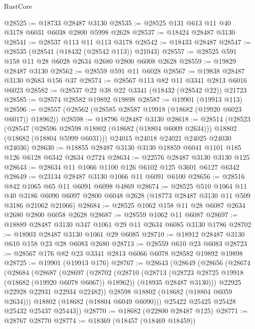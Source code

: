 \begin{lexlean}{RustCore}
\begin{coremodule}
@28525 := @18733 @28487 @3130
@28535 := @28525 @131 @613 @11 @40 @3178 @6031 @6038 @2800 @5998 @2628
@28537 := @18424 @28487 @3130
@28541 := @28537 @113 @11 @113 @3178
@28542 := @18433 @28487
@28547 := @28535 (@28541 (@18432 (@28542 @113)) @21043)
@28557 := @28525 @591 @158 @11 @28 @6028 @2634 @2680 @2800 @6008 @2628
@28559 := @19829 @28487 @3130
@28562 := @28559 @591 @11 @6028
@28567 := @19838 @28487 @3130 @2683 @156 @37
@28574 := @28567 @113 @82 @11 @3341 @2813 @6016 @6023
@28582 := @28537 @22 @38 @22 @3341 (@18432 (@28542 @22)) @21723
@28585 := @28574 @28582 @19892 @19898
@28587 := @19901 (@19913 @113)
@28596 := @28557 (@28562 (@28585 @28587 @19918 (@18682 (@19920 @6023 @6017)) @18962))
@28598 := @18796 @28487 @3130
@28618 := @28514
    (@28523
      (@28547
        (@28596 @28598 @18802 (@18682 (@18804 @6009 @2634)))
        @18802
        (@18682 (@18804 @5999 @6031)))
      @24015
      @24018
      @24021
      @24025
      @24030
      @24036)
@28630 := @18855 @28487 @3130 @3130 @18859 @6041 @1101 @185 @126 @6128 @6342 @2634 @2724
@28634 := @22576 @28487 @3130 @3130 @125
@28643 := @28634 @11 @1066 @1100 @126 @6102 @125 @3601 @6127 @6342
@28649 := @23134 @28487 @3130 @1066 @11 @6091 @6100
@28656 := @28516 @842 @1065 @65 @11 @6091 @6098 @4869
@28674 := @28525
    @510
    @1064
    @11
    @40
    @3186
    @6090
    @6097
    @2800
    @6048
    @2628
    (@18773 @28487 @3130 @11 @509 @3186 @21062 @21066)
@28684 := @28525 @1062 @158 @11 @28 @6087 @2634 @2680 @2800 @6058 @2628
@28687 := @28559 @1062 @11 @6087
@28697 := @18889 @28487 @3130 @347 @1061 @29 @11 @2634 @6085 @3130 @1786
@28702 := @18903 @28487 @3130 @1061 @29 @6085
@28710 := @18912 @28487 @3130 @610 @158 @23 @28 @6083 @2680
@28713 := @28559 @610 @23 @6083
@28723 := @28567 @176 @82 @23 @3341 @2813 @6066 @6078 @28582 @19892 @19898
@28725 := @19901 (@19913 @176)
@28767 := @28643
    (@28649
      (@28656
        (@28674
          (@28684
            (@28687
              (@28697
                (@28702
                  (@28710
                    (@28713 (@28723 @28725 @19918 (@18682 (@19920 @6078 @6067)) @18962))
                    (@18935 @28487 @3130)))
                @22925
                @22928
                @22931
                @22934
                @22482))
            @28598
            @18802
            (@18682 (@18804 @6059 @2634)))
          @18802
          (@18682 (@18804 @6049 @6090)))
        @25422
        @25425
        @25428
        @25432
        @25437
        @25443))
@28770 := @18682 (@22800 @28487 @125)
@28771 := @28767 @28770
@28774 := @18369 (@18457 (@18469 @18459))

\end{coremodule}
\end{lexlean}
